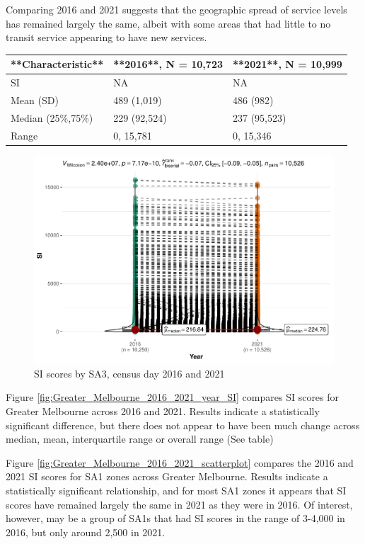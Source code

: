 \documentclass[preprint, 3p,
authoryear]{elsarticle} %
\begin{document}
Comparing 2016 and 2021 suggests that the geographic spread of service
levels has remained largely the same, albeit with some areas that had
little to no transit service appearing to have new services.

\begin{tabular}{l|l|l}
\hline
**Characteristic** & **2016**, N = 10,723 & **2021**, N = 10,999\\
\hline
SI & NA & NA\\
\hline
Mean (SD) & 489 (1,019) & 486 (982)\\
\hline
Median (25\%,75\%) & 229 (92,524) & 237 (95,523)\\
\hline
Range & 0, 15,781 & 0, 15,346\\
\hline
\end{tabular}

\begin{figure}
\centering
\includegraphics{Leveraging_GTFS_to_assess_transit_supply_Transport_Geography_files/figure-latex/Greater_Melbourne_2016_2021_year_SI-1.pdf}
\caption{SI scores by SA3, census day 2016 and 2021}
\end{figure}

Figure \ref{fig:Greater_Melbourne_2016_2021_year_SI} compares SI scores
for Greater Melbourne across 2016 and 2021. Results indicate a
statistically significant difference, but there does not appear to have
been much change across median, mean, interquartile range or overall
range (See table)

Figure \ref{fig:Greater_Melbourne_2016_2021_scatterplot} compares the
2016 and 2021 SI scores for SA1 zones across Greater Melbourne. Results
indicate a statistically significant relationship, and for most SA1
zones it appears that SI scores have remained largely the same in 2021
as they were in 2016. Of interest, however, may be a group of SA1s that
had SI scores in the range of 3-4,000 in 2016, but only around 2,500 in
2021.
\end{document}
